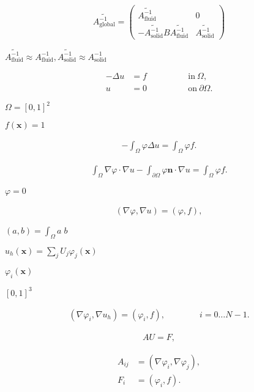 \documentclass{article}
\begin{document}
\[ \widetilde{A_\text{global}^{-1}} = \begin{pmatrix} \widetilde{A_{\text{fluid}}^{-1}} & 0 \\ -\widetilde{A_\text{solid}^{-1}} B \widetilde{A_\text{fluid}^{-1}} & \widetilde{A_{\text{solid}}^{-1}} \end{pmatrix} \]
\pagebreak

$\widetilde{A_{\text{fluid}}^{-1}} \approx A_{\text{fluid}}^{-1}, \widetilde{A_{\text{solid}}^{-1}} \approx A_{\text{solid}}^{-1}$
\pagebreak

\begin{align*} -\Delta u &= f \qquad\qquad & \text{in}\ \Omega, \\ u &= 0 \qquad\qquad & \text{on}\ \partial\Omega. \end{align*}
\pagebreak

$\Omega=[0,1]^2$
\pagebreak

$f(\mathbf x)=1$
\pagebreak

\begin{align*} -\int_\Omega \varphi \Delta u = \int_\Omega \varphi f. \end{align*}
\pagebreak

\begin{align*} \int_\Omega \nabla\varphi \cdot \nabla u - \int_{\partial\Omega} \varphi \mathbf{n}\cdot \nabla u = \int_\Omega \varphi f. \end{align*}
\pagebreak

$\varphi=0$
\pagebreak

\begin{align*} (\nabla\varphi, \nabla u) = (\varphi, f), \end{align*}
\pagebreak

$(a,b)=\int_\Omega a\; b$
\pagebreak

$u_h(\mathbf x)=\sum_j U_j \varphi_j(\mathbf x)$
\pagebreak

$\varphi_i(\mathbf x)$
\pagebreak

$[0,1]^3$
\pagebreak

\begin{align*} (\nabla\varphi_i, \nabla u_h) = (\varphi_i, f), \qquad\qquad i=0\ldots N-1. \end{align*}
\pagebreak

\begin{align*} A U = F, \end{align*}
\pagebreak

\begin{align*} A_{ij} &= (\nabla\varphi_i, \nabla \varphi_j), \\ F_i &= (\varphi_i, f). \end{align*}
\pagebreak
\end{document}
